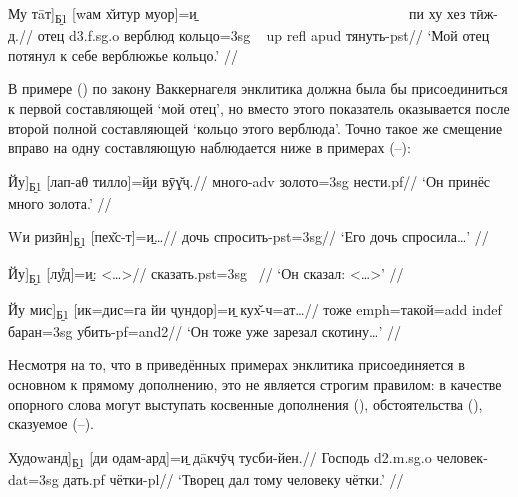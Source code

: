 \begingl
\gla {[}Му тāт{]}\textsubscript{\b{Б1}} {[}wам х̌итур муор{]}=\b{и} ~~~~~~~~~~~~~~~~~~~~~~~~~~~~~ пи ху хез тӣж-д.//
 отец {\sc d3.f.sg.o} верблюд кольцо={\sc 3sg} ~ {\sc up} {\sc refl} {\sc apud} тянуть-{\sc pst}//
\glft ‘Мой отец потянул к себе верблюжье кольцо.’ //
\endgl \xe

В примере () по закону Ваккернагеля энклитика должна была бы присоединиться к первой составляющей ‘мой отец’, но вместо этого показатель оказывается после второй полной составляющей ‘кольцо этого верблюда’. Точно такое же смещение вправо на одну составляющую наблюдается ниже в примерах (–):

\begingl
\gla {[}Йу{]}\textsubscript{\b{Б1}} {[}лап-аθ тилло{]}=\b{йи} вӯɣ̌ҷ.//
 много-{\sc adv} золото={\sc 3sg} нести.{\sc pf}//
\glft ‘Он принёс много золота.’ //
\endgl \xe

\begingl
\gla {[}Wи ризӣн{]}\textsubscript{\b{Б1}} {[}пех̌с-т{]}=\b{и}…//
 дочь спросить-{\sc pst=3sg}//
\glft ‘Его дочь спросила…’ //
\endgl \xe

\begingl
\gla {[}Йу{]}\textsubscript{\b{Б1}} {[}лу̊д{]}=\b{и}: <…>//
 сказать.{\sc pst=3sg} ~//
\glft ‘Он сказал: <…>’ //
\endgl \xe

\begingl
\gla {[}Йу мис{]}\textsubscript{\b{Б1}} {[}ик=дис=га йи ҷундор{]}=\b{и} кух̌-ч=ат…//
 тоже {\sc emph}=такой={\sc add} {\sc indef} баран={\sc 3sg} убить-{\sc pf=and2}//
\glft ‘Он тоже уже зарезал скотину…’ //
\endgl \xe

Несмотря на то, что в приведённых примерах энклитика присоединяется в основном к прямому дополнению, это не является строгим правилом: в качестве опорного слова могут выступать косвенные дополнения (), обстоятельства (), сказуемое (–).

\begingl
\gla {[}Худоwанд{]}\textsubscript{\b{Б1}} {[}ди одам-ард{]}=\b{и} дāкчӯҷ тусби-йен.//
\glc Господь {\sc d2.m.sg.o} человек-{\sc dat=3sg} дать.{\sc pf} чётки-{\sc pl}//
\glft ‘Творец дал тому человеку чётки.’ //
\endgl \xe

